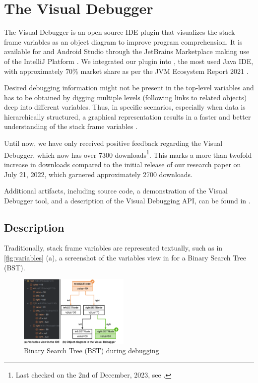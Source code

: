 \documentclass[sigconf]{acmart}
\begin{document}
\section{The Visual Debugger} \label{sec:visualDebugger}

The Visual Debugger is an open-source IDE plugin that visualizes the stack frame variables as an object diagram to improve program comprehension.
It is available for \intellij{} and Android Studio through the JetBrains Marketplace \cite{timkrauterVisualDebuggerIntelliJ2023, timkrauterVisualDebuggerTool2023} making use of the IntelliJ Platform \cite{kurbatovaIntelliJPlatformFramework2021}.
We integrated our plugin into \intellij{}, the most used Java IDE, with approximately 70\% market share as per the JVM Ecosystem Report 2021 \cite{brianvermeerJVMEcosystemReport2021}.

Desired debugging information might not be present in the top-level variables and has to be obtained by digging multiple levels (following links to related objects) deep into different variables.
Thus, in specific scenarios, especially when data is hierarchically structured, a graphical representation results in a faster and better understanding of the stack frame variables \cite{krauterVisualDebuggerTool2022}.

Until now, we have only received positive feedback regarding the Visual Debugger, which now has over 7300 downloads\footnote{Last checked on the 2nd of December, 2023, see \cite{timkrauterVisualDebuggerIntelliJ2023}.}.
This marks a more than twofold increase in downloads compared to the initial release of our research paper \cite{krauterVisualDebuggerTool2022} on July 21, 2022, which garnered approximately 2700 downloads.

Additional artifacts, including source code, a demonstration of the Visual Debugger tool, and a description of the Visual Debugging API, can be found in \cite{timkrauterICSE2024Artifacts2023}.

\subsection{Description}

Traditionally, stack frame variables are represented textually, such as in \autoref{fig:variables} (a), a screenshot of the variables view in \intellij{} for a Binary Search Tree (BST).

\begin{figure}[ht]
    \centering
    \includegraphics[width=0.475\textwidth]{images/visual-debugger-variables.pdf}
    \caption{Binary Search Tree (BST) during debugging}
    \label{fig:variables}
\end{figure}
\end{document}
